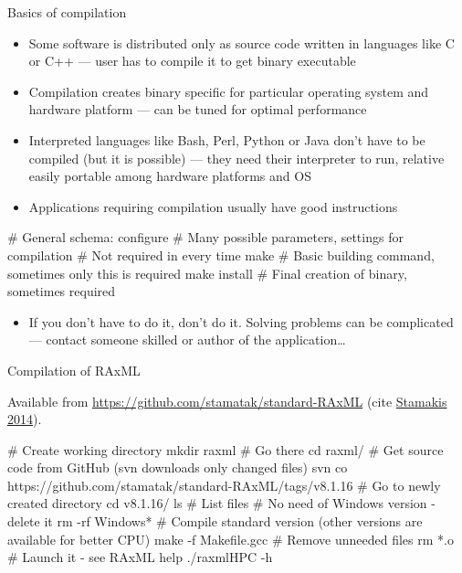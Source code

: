 \documentclass[hyperref={bookmarks=true, unicode=true, colorlinks=true, pdftitle={Linux, command line and MetaCentrum}, plainpages=false, pdfauthor={Vojtech Zeisek}, pdfsubject={Course about use of Linux command line, writing shell scripts and using MetaCentrum of CESNET}, pdfcreator={XeLaTeX, http://www.xelatex.org/}, pdfkeywords={Linux, GNU, BASH, shell, command line, MetaCentrum}, linkcolor=Sienna, anchorcolor=black, citecolor=green, filecolor=magenta, menucolor=Sienna, urlcolor=cyan, pdftex}, compress, ucs, xelatex, xcolor=svgnames, 11pt]{beamer}
\begin{document}
\begin{frame}[fragile]{Basics of compilation}
\begin{itemize}
  \item Some software is distributed only as source code written in languages like C or C++ --- user has to compile it to get binary executable
  \item Compilation creates binary specific for particular operating system and hardware platform --- can be tuned for optimal performance
  \item Interpreted languages like Bash, Perl, Python or Java don't have to be compiled (but it is possible) --- they need their interpreter to run, relative easily portable among hardware platforms and OS
  \item Applications requiring compilation usually have good instructions
\end{itemize}
  \begin{bashcode}
    # General schema:
    configure # Many possible parameters, settings for compilation
              # Not required in every time
    make # Basic building command, sometimes only this is required
    make install # Final creation of binary, sometimes required
  \end{bashcode}
\begin{itemize}
  \item If you don't have to do it, don't do it. Solving problems can be complicated --- contact someone skilled or author of the application\ldots
\end{itemize}
\end{frame}

\begin{frame}[fragile]{Compilation of RAxML}
\begin{footnotesize}
  Available from \href{https://github.com/stamatak/standard-RAxML}{https://github.com/stamatak/standard-RAxML} (cite \href{http://bioinformatics.oxfordjournals.org/content/30/9/1312.abstract}{Stamakis 2014}).
\end{footnotesize}
  \begin{bashcode}
    # Create working directory
    mkdir raxml
    # Go there
    cd raxml/
    # Get source code from GitHub (svn downloads only changed files)
    svn co https://github.com/stamatak/standard-RAxML/tags/v8.1.16
    # Go to newly created directory
    cd v8.1.16/
    ls # List files
    # No need of Windows version - delete it
    rm -rf Windows*
    # Compile standard version (other versions are available for better CPU)
    make -f Makefile.gcc
    # Remove unneeded files
    rm *.o
    # Launch it - see RAxML help
    ./raxmlHPC -h
  \end{bashcode}
\end{frame}
\end{document}
